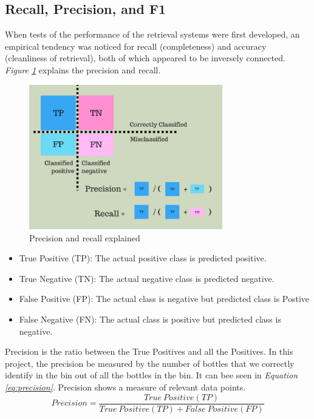 \subsection{Recall, Precision, and F1}
When tests of the performance of the retrieval systems were first developed, an empirical tendency was noticed for recall (completeness) and accuracy (cleanliness of retrieval), both of which appeared to be inversely connected\cite{buckland_relationship_1994}. \textit{Figure \ref{fig:precisionrecall}} explains the precision and recall.

\begin{figure}[h]
    \centering
    \includegraphics[width=0.75\textwidth]{graphics/Precisionrecall.png}
    \caption{Precision and recall explained \cite{mittapally_whats_2019}}
    \label{fig:precisionrecall}
\end{figure}

\begin{itemize}
    \item True Positive (TP): The actual positive class is predicted positive.
    \item True Negative (TN): The actual negative class is predicted negative.
    \item False Positive (FP): The actual class is negative but predicted class is Postive
    \item False Negative (FN): The actual class is positive but predicted class is negative.
\end{itemize}

Precision is the ratio between the True Positives and all the Positives. In this project, the precision be measured by the number of bottles that we correctly identify in the bin out of all the bottles in the bin. It can bee seen in \textit{Equation \ref{eq:precision}}. Precision shows a measure of relevant data points\cite{shung_accuracy_2020}.
\begin{equation}
    Precision = \frac{True\ Positive(TP)}{True\ Positive(TP)+False \ Positive(FP)}
    \label{eq:precision}
\end{equation}


